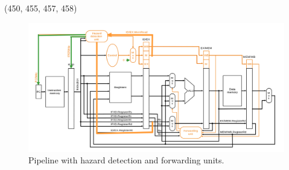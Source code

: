 \begin{theorem}{(450, 455, 457, 458)}
\begin{itemize}
\begin{figure}[H]
            \includegraphics[scale=0.3]{img/pipeline-hazard.png}
            \caption{Pipeline with hazard detection and forwarding units.}
            \label{img:pipeline-hazard}
        \end{figure}
    \end{itemize}
\end{theorem}

